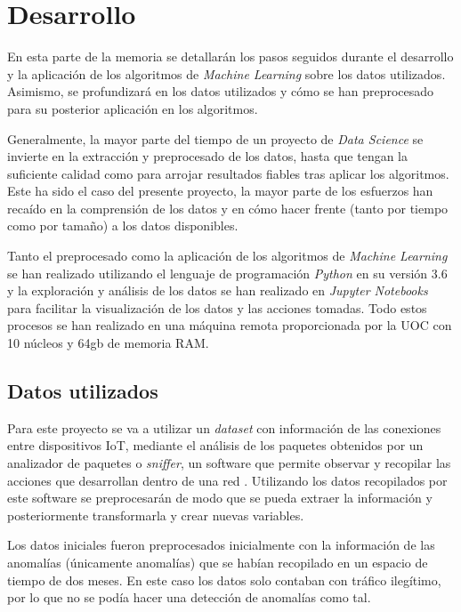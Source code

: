 \chapter{Desarrollo}
\label{chapter:Desarrollo}

En esta parte de la memoria se detallarán los pasos seguidos durante el desarrollo y la aplicación de los algoritmos de \textit{Machine Learning} sobre los datos utilizados. Asimismo, se profundizará en los datos utilizados y cómo se han preprocesado para su posterior aplicación en los algoritmos.

Generalmente, la mayor parte del tiempo de un proyecto de \textit{Data Science} se invierte en la extracción y preprocesado de los datos, hasta que tengan la suficiente calidad como para arrojar resultados fiables tras aplicar los algoritmos. Este ha sido el caso del presente proyecto, la mayor parte de los esfuerzos han recaído en la comprensión de los datos y en cómo hacer frente (tanto por tiempo como por tamaño) a los datos disponibles.

Tanto el preprocesado como la aplicación de los algoritmos de \textit{Machine Learning} se han realizado utilizando el lenguaje de programación \textit{Python} en su versión 3.6 y la exploración y análisis de los datos se han realizado en \textit{Jupyter Notebooks} para facilitar la visualización de los datos y las acciones tomadas. Todo estos procesos se han realizado en una máquina remota proporcionada por la UOC con 10 núcleos y 64gb de memoria RAM.
\newpage

\section{Datos utilizados}

Para este proyecto se va a utilizar un \textit{dataset} con información de las conexiones entre dispositivos IoT, mediante el análisis de los paquetes obtenidos por un analizador de paquetes o \textit{sniffer}, un software que permite observar y recopilar las acciones que desarrollan dentro de una red \cite{sniffer}. Utilizando los datos recopilados por este software se preprocesarán de modo que se pueda extraer la información y posteriormente transformarla y crear nuevas variables.

Los datos iniciales fueron preprocesados inicialmente con la información de las anomalías (únicamente anomalías) que se habían recopilado en un espacio de tiempo de dos meses. En este caso los datos solo contaban con tráfico ilegítimo, por lo que no se podía hacer una detección de anomalías como tal.

